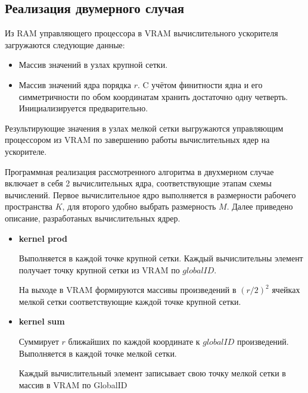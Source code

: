 \subsection*{Реализация двумерного случая}

Из RAM управляющего процессора
в VRAM вычислительного ускорителя
загружаются следующие данные: 
\begin{itemize}
\item
  Массив значений в узлах крупной сетки. %
\item
  Массив значений ядра порядка $r$. %
  C учётом финитности ядна и его симметричности по
  обом координатам хранить достаточно одну четверть.
  Инициализируется предварительно.
\end{itemize}

Результирующие значения в узлах мелкой сетки выгружаются управляющим процессором
из VRAM по завершению работы вычислительных ядер на ускорителе.

Программная реализация рассмотренного алгоритма в двухмерном случае
включает в себя 2 вычислительных ядра, соответствующие этапам схемы вычислений.
Первое вычислительное ядро выполняется в размерности рабочего пространства $K$,
для второго удобно выбрать размерность $M$.
Далее приведено описание, разработаных вычислительных ядрер.
\begin{itemize}
\item
  {\bf kernel prod}

  Выполняется в каждой точке крупной сетки.
  Каждый вычислительны элемент 
  получает точку крупной сетки
  из VRAM по $globalID$. 
  

  На выходе в VRAM
  формируются массивы произведений в $(r/2)^2$ ячейках мелкой сетки  
  соответствующие каждой точке крупной сетки.

  
\item
  {\bf kernel sum}

  Суммирует $r$ ближайших по каждой координате к $globalID$ произведений. 
  Выполняется в каждой точке мелкой сетки.
  
  
  Каждый вычислительный элемент записывает свою точку мелкой сетки в
  массив в VRAM по GlobalID
\end{itemize}






